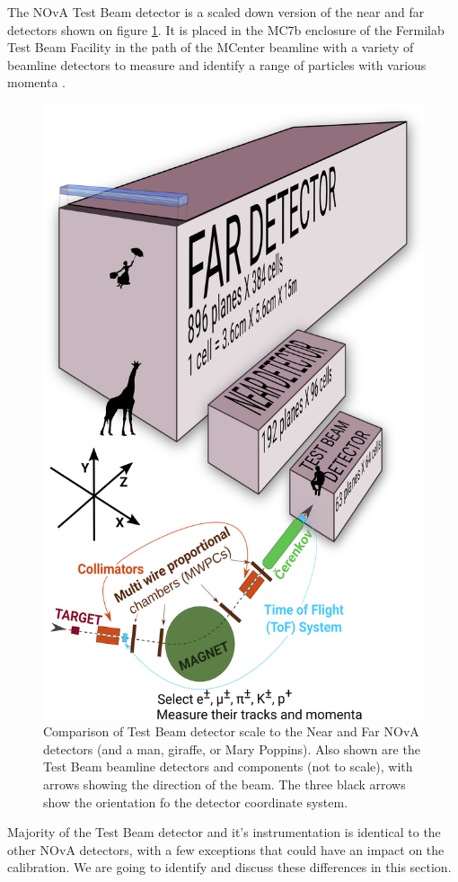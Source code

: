 \documentclass[12pt,a4paper]{article}
\begin{document}
The NOvA Test Beam detector is a scaled down version of the near and far detectors shown on figure \ref{figTBDetector}. It is placed in the MC7b enclosure of the Fermilab Test Beam Facility in the path of the MCenter beamline with a variety of beamline detectors to measure and identify a range of particles with various momenta \cite{NOVA-doc-22172-v2}.

\begin{figure}[!ht]
\centering
\includegraphics[width=.7\textwidth]{Plots/TestBeamDetectorWithArrows.png}
\caption{Comparison of Test Beam detector scale to the Near and Far NOvA detectors (and a man, giraffe, or Mary Poppins). Also shown are the Test Beam beamline detectors and components (not to scale), with arrows showing the direction of the beam. The three black arrows show the orientation fo the detector coordinate system.}
\label{figTBDetector}
\end{figure}

Majority of the Test Beam detector and it's instrumentation is identical to the other NOvA detectors, with a few exceptions that could have an impact on the calibration. We are going to identify and discuss these differences in this section.
\end{document}
